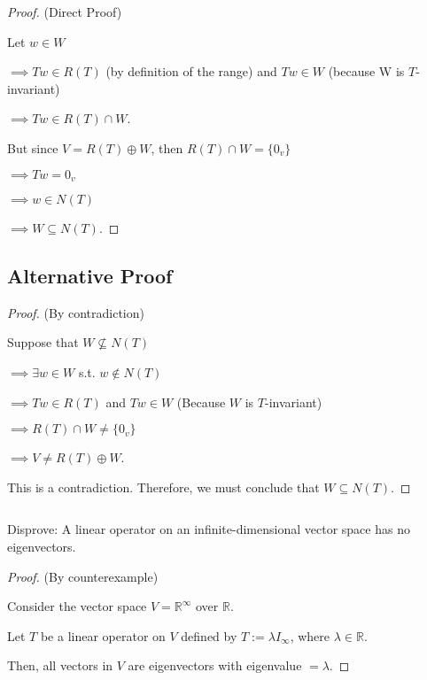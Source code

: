 \documentclass{article}
\newenvironment{customthm}[1]
  {\renewcommand\theinnercustomthm{#1}\innercustomthm}
  {\endinnercustomthm}
\begin{document}
\begin{proof}{(Direct Proof)}
  $ $

  Let $w \in W$

  \noindent
  $\implies Tw \in R(T)$ (by definition of the range) and $Tw \in W$ (because W is $T$-invariant)

  \noindent
  $\implies Tw \in R(T) \cap W$.
  \newline

  But since $V = R(T) \oplus W$, then $R(T) \cap W = \{ 0_v \}$

  \noindent
  $\implies Tw = 0_v$

  \noindent
  $\implies w \in N(T)$

  \noindent
  $\implies W \subseteq N(T)$.

\end{proof}

\subsection*{Alternative Proof}
\begin{proof}{(By contradiction)}
  $ $


  Suppose that $W \not\subseteq N(T)$
  
  \noindent
  $\implies \exists w \in W$ s.t. $w \notin N(T)$

  \noindent
  $\implies Tw \in R(T)$ and $Tw \in W$ \quad (Because $W$ is $T$-invariant)

  \noindent
  $\implies R(T) \cap W \neq \{ 0_v \}$

  \noindent
  $\implies V \neq R(T) \oplus W$.
  \newline

  \noindent
  This is a contradiction. Therefore, we must conclude that $W \subseteq N(T)$.

\end{proof}
\newpage

\begin{customthm}{4}[2023.S(1.A.iv)]
  $ $

  Disprove: A linear operator on an infinite-dimensional vector space has no eigenvectors. 

\end{customthm}

\begin{proof}{(By counterexample)}
  $ $

  Consider the vector space $V = \mathbb{R}^\infty$ over $\mathbb{R}$.

  Let $T$ be a linear operator on $V$ defined by $T := \lambda I_\infty$, where $\lambda \in \mathbb{R}$.

  Then, all vectors in $V$ are eigenvectors with eigenvalue $= \lambda$.

  
\end{proof}
\newpage
\end{document}

